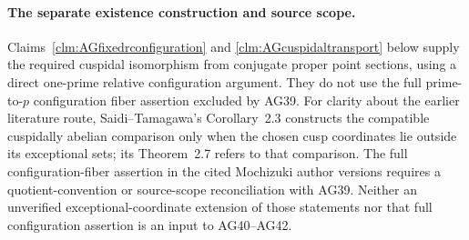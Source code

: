 \paragraph{The separate existence construction and source scope.}
Claims~\ref{clm:AGfixedrconfiguration} and
\ref{clm:AGcuspidaltransport} below supply the required
cuspidal isomorphism from conjugate proper point sections,
using a direct one-prime relative configuration argument.
They do not use the full prime-to-\(p\) configuration
fiber assertion excluded by AG39.
For clarity about the earlier literature route,
Saidi--Tamagawa's Corollary~2.3 constructs the compatible
cuspidally abelian comparison only when the chosen cusp
coordinates lie outside its exceptional sets; its
Theorem~2.7 refers to that comparison. The full
configuration-fiber assertion in the cited Mochizuki
author versions requires a quotient-convention or
source-scope reconciliation with AG39. Neither an
unverified exceptional-coordinate extension of those
statements nor that full configuration assertion is an
input to AG40--AG42.

